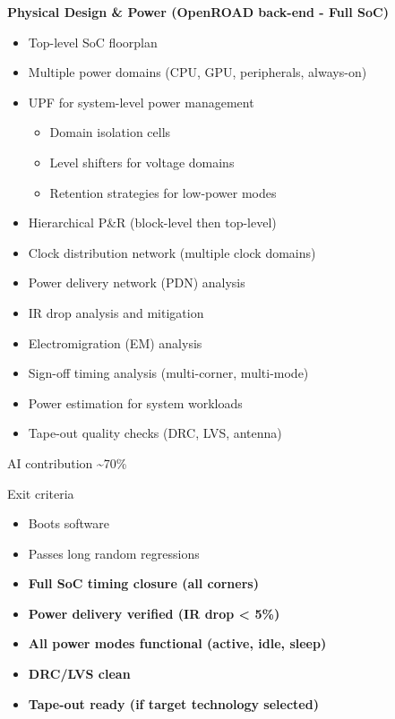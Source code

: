\begin{record}
\textbf{Physical Design \& Power (OpenROAD back-end - Full SoC)}

\begin{itemize}
\tightlist
\item
  Top-level SoC floorplan
\item
  Multiple power domains (CPU, GPU, peripherals, always-on)
\item
  UPF for system-level power management

  \begin{itemize}
  \tightlist
  \item
    Domain isolation cells
  \item
    Level shifters for voltage domains
  \item
    Retention strategies for low-power modes
  \end{itemize}
\item
  Hierarchical P\&R (block-level then top-level)
\item
  Clock distribution network (multiple clock domains)
\item
  Power delivery network (PDN) analysis
\item
  IR drop analysis and mitigation
\item
  Electromigration (EM) analysis
\item
  Sign-off timing analysis (multi-corner, multi-mode)
\item
  Power estimation for system workloads
\item
  Tape-out quality checks (DRC, LVS, antenna)
\end{itemize}

\notemark{} AI contribution \textasciitilde70\%

\ok{} Exit criteria

\begin{itemize}
\tightlist
\item
  Boots software
\item
  Passes long random regressions
\item
  \textbf{Full SoC timing closure (all corners)}
\item
  \textbf{Power delivery verified (IR drop \textless{} 5\%)}
\item
  \textbf{All power modes functional (active, idle, sleep)}
\item
  \textbf{DRC/LVS clean}
\item
  \textbf{Tape-out ready (if target technology selected)}
\end{itemize}

\end{record}


